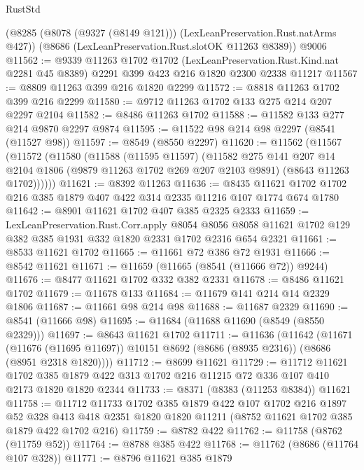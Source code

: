 \begin{lexlean}{RustStd}
\begin{coremodule}
    (@8285 (@8078 (@9327 (@8149 @121))) (LexLeanPreservation.Rust.natArms @427))
    (@8686 (LexLeanPreservation.Rust.slotOK @11263 @8389))
    @9006
@11562 := @9339
    @11263
    @1702
    @1702
    (LexLeanPreservation.Rust.Kind.nat @2281 @45 @8389)
    @2291
    @399
    @423
    @216
    @1820
    @2300
    @2338
    @11217
@11567 := @8809 @11263 @399 @216 @1820 @2299
@11572 := @8818 @11263 @1702 @399 @216 @2299
@11580 := @9712 @11263 @1702 @133 @275 @214 @207 @2297 @2104
@11582 := @8486 @11263 @1702
@11588 := @11582 @133 @277 @214 @9870 @2297 @9874
@11595 := @11522 @98 @214 @98 @2297 (@8541 (@11527 @98))
@11597 := @8549 (@8550 @2297)
@11620 := @11562
    (@11567
      (@11572
        (@11580
          (@11588
            (@11595 @11597)
            (@11582
              @275
              @141
              @207
              @14
              @2104
              @1806
              (@9879 @11263 @1702 @269 @207 @2103 @9891)
              (@8643 @11263 @1702))))))
@11621 := @8392 @11263
@11636 := @8435 @11621 @1702 @1702 @216 @385 @1879 @407 @422 @314 @2335 @11216 @107 @1774 @674 @1780
@11642 := @8901 @11621 @1702 @407 @385 @2325 @2333
@11659 := LexLeanPreservation.Rust.Corr.apply
    @8054
    @8056
    @8058
    @11621
    @1702
    @129
    @382
    @385
    @1931
    @332
    @1820
    @2331
    @1702
    @2316
    @654
    @2321
@11661 := @8533 @11621 @1702
@11665 := @11661 @72 @386 @72 @1931
@11666 := @8542 @11621
@11671 := @11659 (@11665 (@8541 (@11666 @72)) @9244)
@11676 := @8477 @11621 @1702 @332 @382 @2331
@11678 := @8486 @11621 @1702
@11679 := @11678 @133
@11684 := @11679 @141 @214 @14 @2329 @1806
@11687 := @11661 @98 @214 @98
@11688 := @11687 @2329
@11690 := @8541 (@11666 @98)
@11695 := @11684 (@11688 @11690 (@8549 (@8550 @2329)))
@11697 := @8643 @11621 @1702
@11711 := @11636
    (@11642
      (@11671
        (@11676 (@11695 @11697))
        @10151
        @8692
        (@8686 (@8935 @2316))
        (@8686 (@8951 @2318 @1820))))
@11712 := @8699 @11621
@11729 := @11712
    @11621
    @1702
    @385
    @1879
    @422
    @313
    @1702
    @216
    @11215
    @72
    @336
    @107
    @410
    @2173
    @1820
    @1820
    @2344
@11733 := @8371 (@8383 (@11253 @8384)) @11621
@11758 := @11712
    @11733
    @1702
    @385
    @1879
    @422
    @107
    @1702
    @216
    @1897
    @52
    @328
    @413
    @418
    @2351
    @1820
    @1820
    @11211
    (@8752 @11621 @1702 @385 @1879 @422 @1702 @216)
@11759 := @8782 @422
@11762 := @11758 (@8762 (@11759 @52))
@11764 := @8788 @385 @422
@11768 := @11762 (@8686 (@11764 @107 @328))
@11771 := @8796 @11621 @385 @1879

\end{coremodule}
\end{lexlean}
